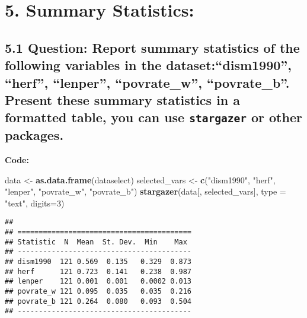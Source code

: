 \documentclass[
]{article}
\newenvironment{Shaded}{\begin{snugshade}}{\end{snugshade}}
\newcommand{\AttributeTok}[1]{\textcolor[rgb]{0.13,0.29,0.53}{#1}}
\newcommand{\DecValTok}[1]{\textcolor[rgb]{0.00,0.00,0.81}{#1}}
\newcommand{\FunctionTok}[1]{\textcolor[rgb]{0.13,0.29,0.53}{\textbf{#1}}}
\newcommand{\NormalTok}[1]{#1}
\newcommand{\OtherTok}[1]{\textcolor[rgb]{0.56,0.35,0.01}{#1}}
\newcommand{\StringTok}[1]{\textcolor[rgb]{0.31,0.60,0.02}{#1}}
\begin{document}
\clearpage

\hypertarget{summary-statistics}{%
\section{5. Summary Statistics:}\label{summary-statistics}}

\hypertarget{question-report-summary-statistics-of-the-following-variables-in-the-datasetdism1990-herf-lenper-povrate_w-povrate_b.-present-these-summary-statistics-in-a-formatted-table-you-can-use-stargazer-or-other-packages.}{%
\subsection{\texorpdfstring{5.1 Question: Report summary statistics of
the following variables in the dataset:``dism1990'', ``herf'',
``lenper'', ``povrate\_w'', ``povrate\_b''. Present these summary
statistics in a formatted table, you can use \texttt{stargazer} or other
packages.}{5.1 Question: Report summary statistics of the following variables in the dataset:``dism1990'', ``herf'', ``lenper'', ``povrate\_w'', ``povrate\_b''. Present these summary statistics in a formatted table, you can use stargazer or other packages.}}\label{question-report-summary-statistics-of-the-following-variables-in-the-datasetdism1990-herf-lenper-povrate_w-povrate_b.-present-these-summary-statistics-in-a-formatted-table-you-can-use-stargazer-or-other-packages.}}

\textbf{Code:}

\begin{Shaded}
\begin{Highlighting}[]
\NormalTok{data }\OtherTok{\textless{}{-}} \FunctionTok{as.data.frame}\NormalTok{(dataselect)}
\NormalTok{selected\_vars }\OtherTok{\textless{}{-}} \FunctionTok{c}\NormalTok{(}\StringTok{"dism1990"}\NormalTok{, }\StringTok{"herf"}\NormalTok{, }\StringTok{"lenper"}\NormalTok{, }\StringTok{"povrate\_w"}\NormalTok{, }\StringTok{"povrate\_b"}\NormalTok{)}
\FunctionTok{stargazer}\NormalTok{(data[, selected\_vars], }\AttributeTok{type =} \StringTok{"text"}\NormalTok{, }\AttributeTok{digits=}\DecValTok{3}\NormalTok{)}
\end{Highlighting}
\end{Shaded}

\begin{verbatim}
## 
## =========================================
## Statistic  N  Mean  St. Dev.  Min    Max 
## -----------------------------------------
## dism1990  121 0.569  0.135   0.329  0.873
## herf      121 0.723  0.141   0.238  0.987
## lenper    121 0.001  0.001   0.0002 0.013
## povrate_w 121 0.095  0.035   0.035  0.216
## povrate_b 121 0.264  0.080   0.093  0.504
## -----------------------------------------
\end{verbatim}
\end{document}
